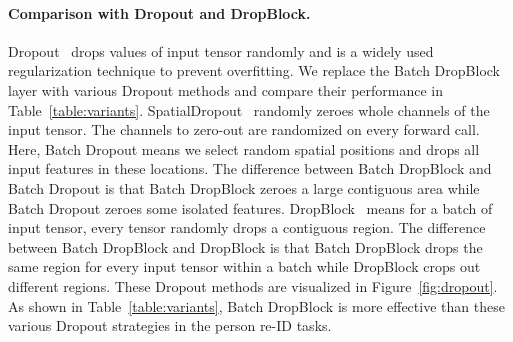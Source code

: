 \documentclass[10pt,twocolumn,letterpaper]{article}
\begin{document}
\begin{table*}[!htb]
\begin{minipage}[t]{.38\linewidth}
\label{table:triplet_loss}
\end{minipage}\hfill \begin{minipage}[t]{.33\linewidth}
\vspace{-3mm}
\caption{The comparison with data augmentation methods. `RE' means Random Erasing~\cite{zhong2017random}. `Cut' means Cutout~\cite{devries2017improved}.}
\label{table:augmentation}
\end{minipage} 
\vspace{-3mm}
\end{table*}

\paragraph{Comparison with Dropout and DropBlock.}\vspace{-4mm} Dropout~\cite{srivastava2014dropout} drops values of input tensor randomly and is a widely used regularization technique to prevent overfitting. 
We replace the Batch DropBlock layer with various Dropout methods and compare their performance in Table~\ref{table:variants}. 
SpatialDropout~\cite{tompson2015efficient} randomly zeroes whole channels of the input tensor. The channels to zero-out are randomized on every forward call. 
Here, Batch Dropout means we select random spatial positions and drops all input features in these locations. The difference between Batch DropBlock and Batch Dropout is that Batch DropBlock zeroes a large contiguous area while Batch Dropout zeroes some isolated features. 
DropBlock~\cite{ghiasi2018dropblock} means for a batch of input tensor, every tensor randomly drops a contiguous region. 
The difference between Batch DropBlock and DropBlock is that Batch DropBlock drops the same region for every input tensor within a batch while DropBlock crops out different regions. These Dropout methods are visualized in Figure~\ref{fig:dropout}.
As shown in Table~\ref{table:variants}, Batch DropBlock is more effective than these various Dropout strategies in the person re-ID tasks.
\end{document}
